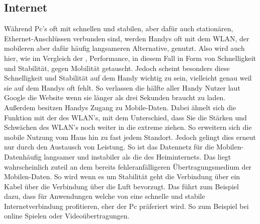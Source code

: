 \subsection{Internet}\label{PcVsPhone:Internet}\myCheckmark
Während Pc's oft mit schnellen und stabilen, aber dafür auch stationären, Ethernet-Anschlüssen verbunden sind, werden Handys oft mit dem WLAN, der mobileren aber dafür häufig langsameren Alternative, genutzt. 
Also wird auch hier, wie im Vergleich der , Performance, in diesem Fall in Form von Schnelligkeit und Stabilität, gegen Mobilität getauscht. \newline%
Jedoch scheint besonders diese Schnelligkeit und Stabilität auf dem Handy wichtig zu sein, vielleicht genau weil sie auf dem Handys oft fehlt. So verlassen die hälfte aller Handy Nutzer laut Google die Website wenn sie länger als drei Sekunden braucht zu laden\cite{pcVsphone_threeSeconds}.\newline%
Außerdem besitzen Handys Zugang zu \dq Mobile-Daten\dq. Dabei ähnelt sich die Funktion mit der des WLAN's, mit dem Unterschied, dass Sie die Stärken und Schwächen des WLAN's noch weiter in die extreme ziehen. So erweitern sich die mobile Nutzung vom Haus hin zu fast jedem Standort. Jedoch gelingt dies erneut nur durch den Austausch von Leistung. So ist das Datennetz für die \dq Mobilen-Daten\dq häufig langsamer und instabiler als die des Heiminternets. Das liegt wahrscheinlich zuteil an dem bereits fehleranfälligeren Übertragungsmedium der Mobilen-Daten. So wird wenn es um Stabilität geht die Verbindung über ein Kabel über die Verbindung über die Luft bevorzugt.\newline%
Das führt zum Beispiel dazu, dass für Anwendungen welche von eine schnelle und stabile Internetverbindung profitieren, eher der Pc präferiert wird. So zum Beispiel bei online Spielen oder Videoübertragungen.




